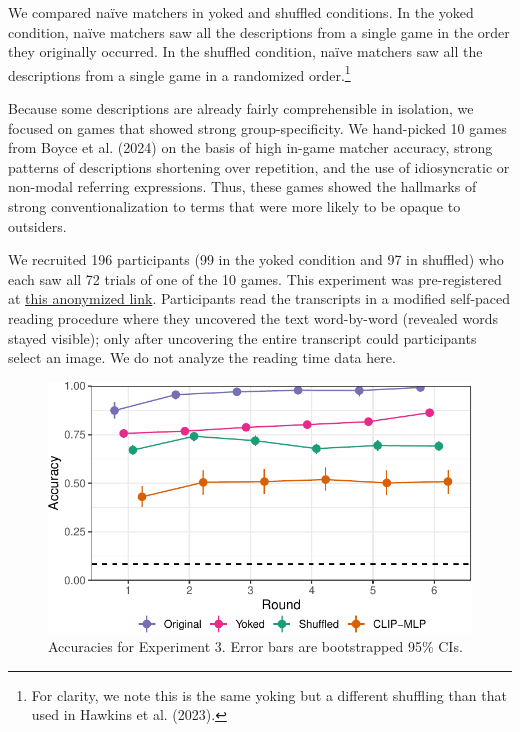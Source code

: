 \documentclass[10pt, letterpaper]{article}
\begin{document}
We compared naïve matchers in yoked and shuffled conditions. In the
yoked condition, naïve matchers saw all the descriptions from a single
game in the order they originally occurred. In the shuffled condition,
naïve matchers saw all the descriptions from a single game in a
randomized order.\footnote{For clarity, we note this is the same yoking
  but a different shuffling than that used in Hawkins et al. (2023).}

Because some descriptions are already fairly comprehensible in
isolation, we focused on games that showed strong group-specificity. We
hand-picked 10 games from Boyce et al. (2024) on the basis of high
in-game matcher accuracy, strong patterns of descriptions shortening
over repetition, and the use of idiosyncratic or non-modal referring
expressions. Thus, these games showed the hallmarks of strong
conventionalization to terms that were more likely to be opaque to
outsiders.

We recruited 196 participants (99 in the yoked condition and 97 in
shuffled) who each saw all 72 trials of one of the 10 games. This
experiment was pre-registered at
\href{https://osf.io/zqwp5/?view_only=87420dc86f0a4a56a395cd464aa3a5c1}{this
anonymized link}. Participants read the transcripts in a modified
self-paced reading procedure where they uncovered the text word-by-word
(revealed words stayed visible); only after uncovering the entire
transcript could participants select an image. We do not analyze the
reading time data here.

\begin{CodeChunk}
\begin{figure}[t]

{\centering \includegraphics[width=0.9\linewidth]{figs/fig-yoked-1} 

}

\caption[Accuracies for Experiment 3]{Accuracies for Experiment 3. Error bars are bootstrapped 95\% CIs. \label{yoked}}\label{fig:fig-yoked}
\end{figure}
\end{CodeChunk}
\end{document}
